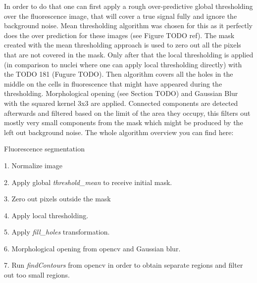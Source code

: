 In order to do that one can first apply a rough over-predictive global thresholding over the fluorescence image, that will cover a true signal fully and ignore the background noise. Mean thresholding algorithm was chosen for this as it perfectly does the over prediction for these images (see Figure TODO ref). The mask created with the mean thresholding approach is used to zero out all the pixels that are not covered in the mask. Only after that the local thresholding is applied (in comparison to nuclei where one can apply local thresholding directly) with the TODO 181 (Fugure TODO). Then  algorithm covers all the holes in the middle on the cells in fluorescence that might have appeared during the thresholding. Morphological opening (see Section TODO) and Gaussian Blur with the squared kernel 3x3 are applied. Connected components are detected afterwards and filtered based on the limit of the area they occupy, this filters out mostly very small components from the mask which might be produced by the left out background noise. The whole algorithm overview you can find here:


\begin{algorithm}
    \caption{Fluorescence segmentation}\label{alg:global-thresholding}
    \begin{algorithmic}
    \item 1. Normalize image
    \item 2. Apply global \textit{threshold\_mean} to receive initial mask.
    \item 3. Zero out pixels outside the mask
    \item 4. Apply local thresholding.  
    \item 5. Apply \textit{fill\_holes} transformation.
    \item 6. Morphological opening from opencv and Gaussian blur.
    \item 7. Run \textit{findContours} from opencv in order to obtain separate regions and filter out too small regions.
    \end{algorithmic}
\end{algorithm}    


